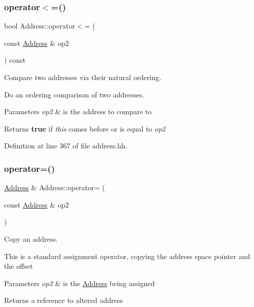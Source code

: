 \mbox{\label{class_address_a8d3c3b93cd942cfeb881ea577dfb869f}} 
\subsubsection{\texorpdfstring{operator$<$=()}{operator<=()}}
{\footnotesize\ttfamily bool Address\+::operator$<$= (\begin{DoxyParamCaption}\item[{const \mbox{\hyperlink{class_address}{Address}} \&}]{op2 }\end{DoxyParamCaption}) const\hspace{0.3cm}{\ttfamily [inline]}}



Compare two addresses via their natural ordering. 

Do an ordering comparison of two addresses. 
\begin{DoxyParams}{Parameters}
{\em op2} & is the address to compare to \\
\hline
\end{DoxyParams}
\begin{DoxyReturn}{Returns}
{\bfseries{true}} if {\itshape this} comes before or is equal to {\itshape op2} 
\end{DoxyReturn}


Definition at line 367 of file address.\+hh.

\mbox{\label{class_address_a942aba71799e61225a20135d3dc86453}} 
\subsubsection{\texorpdfstring{operator=()}{operator=()}}
{\footnotesize\ttfamily \mbox{\hyperlink{class_address}{Address}} \& Address\+::operator= (\begin{DoxyParamCaption}\item[{const \mbox{\hyperlink{class_address}{Address}} \&}]{op2 }\end{DoxyParamCaption})\hspace{0.3cm}{\ttfamily [inline]}}



Copy an address. 

This is a standard assignment operator, copying the address space pointer and the offset 
\begin{DoxyParams}{Parameters}
{\em op2} & is the \mbox{\hyperlink{class_address}{Address}} being assigned \\
\hline
\end{DoxyParams}
\begin{DoxyReturn}{Returns}
a reference to altered address 
\end{DoxyReturn}


